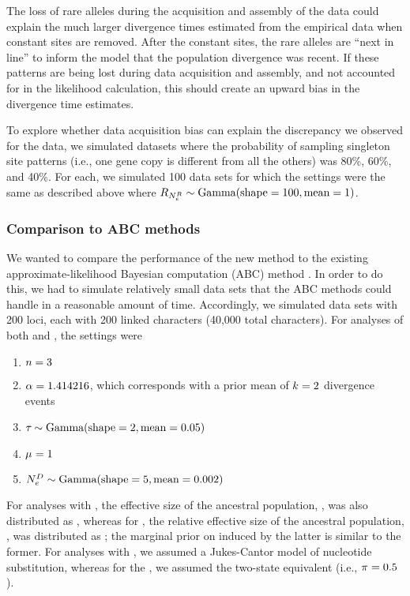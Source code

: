The loss of rare alleles during the acquisition and assembly of the data could
explain the much larger divergence times estimated from the empirical data when
constant sites are removed.
After the constant sites, the rare alleles are ``next in line'' to inform the
model that the population divergence was recent.
If these patterns are being lost during data acquisition and assembly, and not
accounted for in the likelihood calculation, this should create an upward bias
in the divergence time estimates.

To explore whether data acquisition bias can explain the discrepancy we
observed for the  data, we simulated datasets where the probability
of sampling singleton site patterns (i.e., one gene copy is different from all
the others) was 80\%, 60\%, and 40\%.
For each, we simulated 100 data sets for which the settings were
the same as described above where
$\rootrelativepopsize \sim \dgamma{100}{1}$.


\subsubsection{Comparison to ABC methods}
We wanted to compare the performance of the new method to the existing
approximate-likelihood Bayesian computation (ABC) method \dppmsbayes 
\citep{Oaks2014dpp}.
In order to do this, we had to simulate relatively small data sets that the ABC
methods could handle in a reasonable amount of time.
Accordingly, we simulated data sets with 200 loci, each with 200 linked
characters (40,000 total characters).
For analyses of both \ecoevolity and \dppmsbayes, the settings were
\begin{enumerate}
    \item $\ncomparisons = 3$
    \item $\concentration = 1.414216$, which corresponds with a prior mean of
        $\nevents = 2$ divergence events
    \item $\divtime \sim \dgamma{2}{0.05}$
    \item $\murate = 1$
    \item $\epopsize[\descendantpopindex{}] \sim \dgamma{5}{0.002}$
\end{enumerate}
For analyses with \dppmsbayes, the effective size of the ancestral population,
\epopsize[\rootpopindex], was also distributed as , whereas
for \ecoevolity, the relative effective size of the ancestral population,
\rootrelativepopsize, was distributed as ;
the marginal prior on \epopsize[\rootpopindex] induced by the latter is similar
to the former.
For analyses with \dppmsbayes, we assumed a Jukes-Cantor model of nucleotide
substitution, whereas for the \ecoevolity, we assumed the two-state equivalent
(i.e., $\gfreq = 0.5$).


